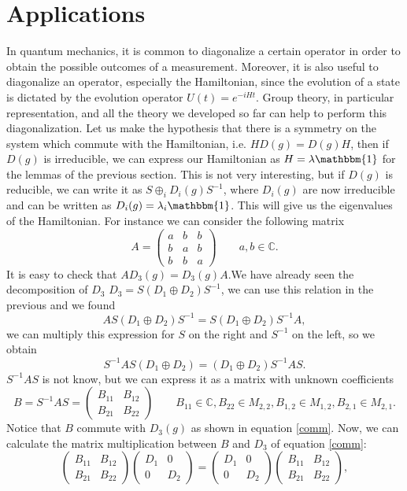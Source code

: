 \documentclass[12pt]{book}
\theoremstyle{plain}
\newcommand{\I}{\mathbbm{1}}
\newcommand{\C}{\mathbb{C}}
\theoremstyle{definition}
\theoremstyle{remark}
\begin{document}
\section{Applications}
In quantum mechanics, it is common to diagonalize a certain operator in order to obtain the possible outcomes of a measurement. Moreover, it is also useful to diagonalize an operator, especially the Hamiltonian, since the evolution of a state is dictated by the evolution operator $U(t) = e^{-iHt}$. Group theory, in particular representation, and all the theory we developed so far can help to perform this diagonalization. Let us make the hypothesis that there is a symmetry on the system which commute with the Hamiltonian, i.e. $H D(g) = D(g)H$, then if $D(g)$ is irreducible, we can express our Hamiltonian as $H = \lambda\I$ for the lemmas of the previous section. This is not very interesting, but if $D(g)$ is reducible, we can write it as $S \oplus_i D_i(g)S^{-1}$, where $D_i(g)$ are now irreducible and can be written as $D_i(g) = \lambda_i \I$. This will give us the eigenvalues of the Hamiltonian. For instance we can consider the following matrix
\[A = \begin{pmatrix}
a&b&b\\b&a&b\\b&b&a
\end{pmatrix}\qquad a,b\in \C.\]
It is easy to check that $AD_3(g) = D_3(g)A$.We have already seen the decomposition of $D_3$ $D_3 = S(D_1\oplus D_2)S^{-1}$, we can use this relation in the previous and we found
\[AS(D_1\oplus D_2)S^{-1} = S(D_1\oplus D_2)S^{-1}A,\]
we can multiply this expression for $S$ on the right and $S^{-1}$ on the left, so we obtain
\begin{equation}\label{comm}S^{-1}AS(D_1\oplus D_2) = (D_1\oplus D_2)S^{-1}AS.\end{equation}
$S^{-1}AS$ is not know, but we can express it as a matrix with unknown coefficients
\[B = S^{-1}AS = \begin{pmatrix}
B_{11}&B_{12}\\
B_{21}&B_{22}
\end{pmatrix}\qquad B_{11}\in\C,B_{22}\in M_{2,2},B_{1,2}\in M_{1,2},B_{2,1}\in M_{2,1}.\]
Notice that $B$ commute with $D_3(g)$ as shown in equation \eqref{comm}. Now, we can calculate the matrix multiplication between $B$ and $D_3$ of equation \eqref{comm}:
\[\begin{pmatrix}
B_{11}&B_{12}\\
B_{21}&B_{22}
\end{pmatrix} \begin{pmatrix}
D_1&0\\
0&D_2
\end{pmatrix} = \begin{pmatrix}
D_1&0\\
0&D_2
\end{pmatrix} \begin{pmatrix}
B_{11}&B_{12}\\
B_{21}&B_{22}
\end{pmatrix},\]
\end{document}
